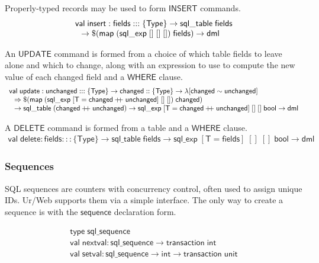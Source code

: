 \documentclass{article}
\newcommand{\mt}[1]{\mathsf{#1}}
\newcommand{\rc}{+ \hspace{-.075in} + \;}
\begin{document}
Properly-typed records may be used to form $\mt{INSERT}$ commands.
$$\begin{array}{l}
  \mt{val} \; \mt{insert} : \mt{fields} ::: \{\mt{Type}\} \to \mt{sql\_table} \; \mt{fields} \\
  \hspace{.1in} \to \$(\mt{map} \; (\mt{sql\_exp} \; [] \; [] \; []) \; \mt{fields}) \to \mt{dml}
\end{array}$$

An $\mt{UPDATE}$ command is formed from a choice of which table fields to leave alone and which to change, along with an expression to use to compute the new value of each changed field and a $\mt{WHERE}$ clause.
$$\begin{array}{l}
  \mt{val} \; \mt{update} : \mt{unchanged} ::: \{\mt{Type}\} \to \mt{changed} :: \{\mt{Type}\} \to \lambda [\mt{changed} \sim \mt{unchanged}] \\
  \hspace{.1in} \Rightarrow \$(\mt{map} \; (\mt{sql\_exp} \; [\mt{T} = \mt{changed} \rc \mt{unchanged}] \; [] \; []) \; \mt{changed}) \\
  \hspace{.1in} \to \mt{sql\_table} \; (\mt{changed} \rc \mt{unchanged}) \to \mt{sql\_exp} \; [\mt{T} = \mt{changed} \rc \mt{unchanged}] \; [] \; [] \; \mt{bool} \to \mt{dml}
\end{array}$$

A $\mt{DELETE}$ command is formed from a table and a $\mt{WHERE}$ clause.
$$\begin{array}{l}
  \mt{val} \; \mt{delete} : \mt{fields} ::: \{\mt{Type}\} \to \mt{sql\_table} \; \mt{fields} \to \mt{sql\_exp} \; [\mt{T} = \mt{fields}] \; [] \; [] \; \mt{bool} \to \mt{dml}
\end{array}$$

\subsubsection{Sequences}

SQL sequences are counters with concurrency control, often used to assign unique IDs.  Ur/Web supports them via a simple interface.  The only way to create a sequence is with the $\mt{sequence}$ declaration form.

$$\begin{array}{l}
  \mt{type} \; \mt{sql\_sequence} \\
  \mt{val} \; \mt{nextval} : \mt{sql\_sequence} \to \mt{transaction} \; \mt{int} \\
  \mt{val} \; \mt{setval} : \mt{sql\_sequence} \to \mt{int} \to \mt{transaction} \; \mt{unit}
\end{array}$$
\end{document}
